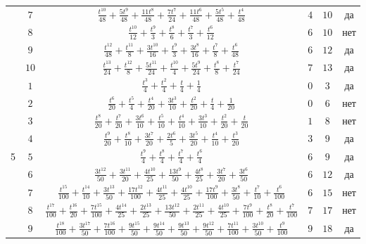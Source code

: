\documentclass[14pt, a4paper, russian]{report}
\begin{document}
\begin{table}[H]
\begin{small}
\begin{center}
\begin{tabular}{|c|c|c|c|c|c|}
                    & $7$ & $\frac{t^{10}}{48}+\frac{5 t^9}{48}+\frac{11 t^8}{48}+\frac{7 t^7}{24}+\frac{11 t^6}{48}+\frac{5 t^5}{48}+\frac{t^4}{48}$ & $4$ & $10$ & да \\
                    & $8$ & $\frac{t^{10}}{12}+\frac{t^9}{3}+\frac{t^8}{6}+\frac{t^7}{3}+\frac{t^6}{12}$ & $6$ & $10$ & нет \\
                    & $9$ & $\frac{t^{12}}{48}+\frac{t^{11}}{8}+\frac{3 t^{10}}{16}+\frac{t^9}{3}+\frac{3 t^8}{16}+\frac{t^7}{8}+\frac{t^6}{48}$ & $6$ & $12$ & да \\
                    & $10$ & $ \frac{t^{13}}{24}+\frac{t^{12}}{8}+\frac{5 t^{11}}{24}+\frac{t^{10}}{4}+\frac{5 t^9}{24}+\frac{t^8}{8}+\frac{t^7}{24} $ & $7$ & $13$ & да \\
                    \hline
\multirow{10}{*}{5} & $1$ & $\frac{t^3}{4}+\frac{t^2}{4}+\frac{t}{4}+\frac{1}{4}$ & $0$  & $3$ & да \\
                    & $2$ &  $\frac{t^6}{20}+\frac{t^5}{4}+\frac{t^4}{20}+\frac{3 t^3}{10}+\frac{t^2}{20}+\frac{t}{4}+\frac{1}{20}$ & $0$ & $6$ & нет \\
                    & $3$ &  $\frac{t^8}{20}+\frac{t^7}{20}+\frac{3 t^6}{10}+\frac{t^5}{10}+\frac{t^4}{10}+\frac{3 t^3}{10}+\frac{t^2}{20}+\frac{t}{20}$ & $1$ & $8$ & нет \\
                    & $4$ &  $\frac{t^9}{20}+\frac{t^8}{10}+\frac{3 t^7}{20}+\frac{2 t^6}{5}+\frac{3 t^5}{20}+\frac{t^4}{10}+\frac{t^3}{20}$& $3$ & $9$ & да \\
                    & $5$ & $\frac{t^9}{4}+\frac{t^8}{4}+\frac{t^7}{4}+\frac{t^6}{4}$ & $6$ & $9$ & да\\
                    & $6$ & $\frac{3 t^{12}}{50}+\frac{3 t^{11}}{20}+\frac{4 t^{10}}{25}+\frac{13 t^9}{50}+\frac{4 t^8}{25}+\frac{3 t^7}{20}+\frac{3 t^6}{50}$ & $6$ & $12$ & да  \\
                    & $7$ & $\frac{t^{15}}{100}+\frac{t^{14}}{10}+\frac{3 t^{13}}{50}+\frac{17 t^{12}}{100}+\frac{4 t^{11}}{25}+\frac{4 t^{10}}{25}+\frac{17 t^9}{100}+\frac{3 t^8}{50}+\frac{t^7}{10}+\frac{t^6}{100}$ & $6$ & $15$ & нет \\
                    & $8$ & $\frac{t^{17}}{100}+\frac{t^{16}}{20}+\frac{7 t^{15}}{100}+\frac{4 t^{14}}{25}+\frac{2 t^{13}}{25}+\frac{13 t^{12}}{50}+\frac{2 t^{11}}{25}+\frac{4 t^{10}}{25}+\frac{7 t^9}{100}+\frac{t^8}{20}+\frac{t^7}{100}$ & $7$ & $17$ & нет \\
                    & $9$ & $\frac{t^{18}}{100}+\frac{3 t^{17}}{50}+\frac{7 t^{16}}{100}+\frac{9 t^{15}}{50}+\frac{9 t^{14}}{50}+\frac{9 t^{13}}{50}+\frac{9 t^{12}}{50}+\frac{7 t^{11}}{100}+\frac{3 t^{10}}{50}+\frac{t^9}{100}$ & $9$ & $18$ & да \\

\end{tabular}
\end{center}
\end{small}
\end{table}
\end{document}
